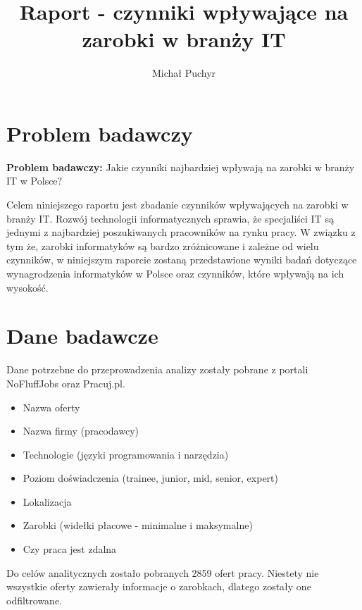 \documentclass{article}
\title{Raport - czynniki wpływające na zarobki w branży IT}
\author{Michał Puchyr}
\begin{document}


\section{Problem badawczy}

\textbf{Problem badawczy:} Jakie czynniki najbardziej wpływają na zarobki w branży IT w Polsce?

Celem niniejszego raportu jest zbadanie czynników wpływających na zarobki w branży IT. Rozwój technologii informatycznych sprawia, że specjaliści IT
są jednymi z najbardziej poszukiwanych pracowników na rynku pracy. W związku z tym że, zarobki informatyków są bardzo zróżnicowane i zależne od wielu czynników,
w niniejszym raporcie zostaną przedstawione wyniki badań dotyczące wynagrodzenia informatyków w Polsce oraz czynników, które wpływają na ich wysokość.


\section{Dane badawcze}

Dane potrzebne do przeprowadzenia analizy zostały pobrane z portali NoFluffJobs oraz Pracuj.pl.

\begin{itemize}
    \item Nazwa oferty
    \item Nazwa firmy (pracodawcy)
    \item Technologie (języki programowania i narzędzia)
    \item Poziom doświadczenia (trainee, junior, mid, senior, expert)
    \item Lokalizacja
    \item Zarobki (widełki płacowe - minimalne i maksymalne)
    \item Czy praca jest zdalna
\end{itemize}

\bigskip

Do celów analitycznych zostało pobranych 2859 ofert pracy.
Niestety nie wszystkie oferty zawierały informacje o zarobkach, dlatego zostały one odfiltrowane.
\end{document}
